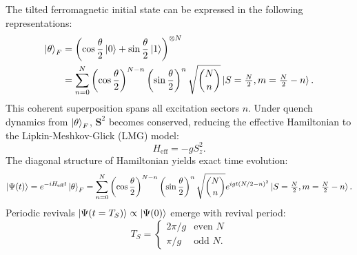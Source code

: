 \documentclass[reprint,superscriptaddress,preprintnumbers,longbibliography,
amsmath,amssymb,aps,floatfix,pra,twocolumn, tightenlines %
]{revtex4-2}
\begin{document}
    The tilted ferromagnetic initial state can be expressed in the following representations:
    \begin{align}
    \ket{\theta}_F &= \left( \cos\frac{\theta}{2} \ket{0} + \sin\frac{\theta}{2} \ket{1} \right)^{\otimes N} \\
    &= \sum_{n=0}^N \left(\cos\frac{\theta}{2}\right)^{N-n}\left(\sin\frac{\theta}{2}\right)^{n} \sqrt{\binom{N}{n}} \ket{S = \tfrac{N}{2}, m = \tfrac{N}{2} - n}.
    \end{align}
    This coherent superposition spans all excitation sectors $n$.
    Under quench dynamics from $\ket{\theta}_F$, $\boldsymbol{S}^2$ becomes conserved, reducing the effective Hamiltonian to the Lipkin-Meshkov-Glick (LMG) model:
    \begin{equation}
    H_{\text{eff}} = -g S_z^2.
    \end{equation}
    The diagonal structure of Hamiltonian yields exact time evolution:
    \begin{equation}
    \ket{\Psi(t)} = e^{-iH_{\text{eff}} t} \ket{\theta}_F = \sum_{n=0}^N \left( \cos\frac{\theta}{2} \right)^{N-n} \left( \sin\frac{\theta}{2} \right)^n \sqrt{\binom{N}{n}} e^{i g t (N/2 - n)^2} \ket{S = \tfrac{N}{2}, m = \tfrac{N}{2} - n}.
    \end{equation}
    Periodic revivals $\ket{\Psi(t = T_S)} \propto \ket{\Psi(0)}$ emerge with revival period:
    \begin{equation}
    T_S = \begin{cases} 
          2\pi/g & \text{even } N \\
          \pi/g & \text{odd } N 
       .\end{cases}
    \end{equation}
    
\end{document}
